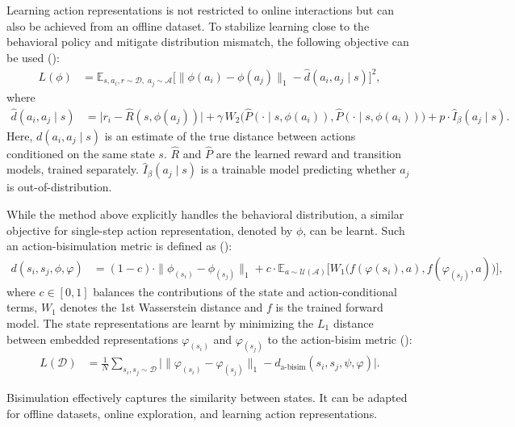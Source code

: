 \documentclass{article}
\begin{document}
Learning action representations is not restricted to online interactions but can also be achieved from an offline dataset. To stabilize learning close to the behavioral policy and mitigate distribution mismatch, the following objective can be used (\cite{gu2022learning}):
\begin{align}
L(\phi) 
&= \mathbb{E}_{s, a_i, r \sim \mathcal{D}, \; a_j \sim \mathcal{A}} 
   \Big[ \big\| \phi(a_{i}) - \phi(a_{j}) \big\|_1 - \hat{d}(a_i, a_j \mid s) \Big]^2,
\label{eq:mod_obj}
\end{align}
where
\begin{align}
\hat{d}(a_i, a_j \mid s) 
&= \big| r_{i} - \hat{R}(s, \phi(a_{j})) \big|
   + \gamma \, W_2 \big( \hat{P}(\cdot \mid s,  \phi(a_{i})), \hat{P}(\cdot \mid s,  \phi(a_{i})) \big)
   + p \cdot \hat{I}_\beta(a_j \mid s).
\label{eq:estimated_d}
\end{align}
Here, $d(a_i, a_j \mid s)$ is an estimate of the true distance between actions conditioned on the same state $s$. $\hat{R}$ and $\hat{P}$ are the learned reward and transition models, trained separately. $\hat{I}_\beta(a_j \mid s)$ is a trainable model predicting whether $a_j$ is out-of-distribution.

While the method above explicitly handles the behavioral distribution, a similar objective for single-step action representation, denoted by $\phi$, can be learnt. Such an action-bisimulation metric is defined as (\cite{rudolph2024learning}):
\begin{align}
d(s_i, s_j, \phi, \varphi) 
&= (1-c) \cdot \| \phi_(s_i) - \phi_(s_j) \|_1 
   + c \cdot \mathbb{E}_{a \sim \mathcal{U}(\mathcal{A})} 
       \Big[ W_1 \big( f(\varphi(s_i), a), f(\varphi_(s_j), a) \big) \Big],
\label{eq:da_bisim}
\end{align}
where $c \in [0,1]$ balances the contributions of the state and action-conditional terms, $W_1$ denotes the 1st Wasserstein distance and $f$ is the trained  forward model. The state representations are learnt by minimizing the $L_1$ distance between embedded representations 
$\varphi_(s_i)$ and $\varphi_(s_j)$ to the action-bisim metric (\cite{rudolph2024learning}):
\begin{align}
L(\mathcal{D}) 
&= \frac{1}{N} \sum_{s_i, s_j \sim \mathcal{D}} 
   \Big| \| \varphi_(s_i) - \varphi_(s_j) \|_1 
   - d_{\text{a-bisim}}(s_i, s_j, \psi, \varphi) \Big|.
\label{eq:da_bisim_loss}
\end{align}

Bisimulation effectively captures the similarity between states. It can be adapted for offline datasets, online exploration, and learning action representations. 
\end{document}
